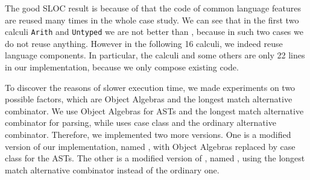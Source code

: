 The good SLOC result is because of that the code of common language features
are reused many times in the whole case study. We can see that in the first two calculi
\lstinline{Arith} and \lstinline{Untyped} we are not better than \ilyaimpl{},
because in such two cases we do not reuse anything.
However in the following 16 calculi, we indeed reuse language components.
In particular, the calculi  and some others are only 22 lines
in our implementation, because we only compose existing code.

To discover the reasons of slower execution time, we made experiments
on two possible factors, which are Object Algebras and the longest match alternative combinator.
We use Object Algebras for ASTs and the longest match alternative combinator \inlinecode{|||} for parsing,
while \ilyaimpl{} uses case class and the ordinary alternative combinator.
Therefore, we implemented two more versions. One is a modified version of our implementation,
named \ourclass{}, with Object Algebras replaced by case class for the ASTs.
The other is a modified version of \ilyaimpl{}, named \ilyalongest{},
using the longest match alternative combinator instead of the ordinary one.

